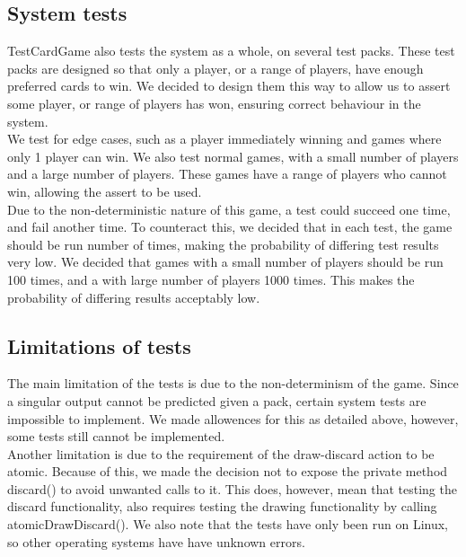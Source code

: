 \documentclass[11p]{article}
\begin{document}
\subsection{System tests}
TestCardGame also tests the system as a whole, on several test packs. These test packs are designed so that only a player, or a range of players, have enough preferred cards to win. We decided to design them this way to allow us to assert some player, or range of players has won, ensuring correct behaviour in the system. \\
We test for edge cases, such as a player immediately winning and games where only 1 player can win. We also test normal games, with a small number of players and a large number of players. These games have a range of players who cannot win, allowing the assert to be used.\\
Due to the non-deterministic nature of this game, a test could succeed one time, and fail another time. To counteract this, we decided that in each test, the game should be run number of times, making the probability of differing test results very low. We decided that games with a small number of players should be run 100 times, and a with large number of players 1000 times. This makes the probability of differing results acceptably low.

\subsection{Limitations of tests}
The main limitation of the tests is due to the non-determinism of the game. Since a singular output cannot be predicted given a pack, certain system tests are impossible to implement. We made allowences for this as detailed above, however, some tests still cannot be implemented.\\
Another limitation is due to the requirement of the draw-discard action to be atomic. Because of this, we made the decision not to expose the private method discard() to avoid unwanted calls to it. This does, however, mean that testing the discard functionality, also requires testing the drawing functionality by calling atomicDrawDiscard().
We also note that the tests have only been run on Linux, so other operating systems have have unknown errors.
\newpage
\end{document}
